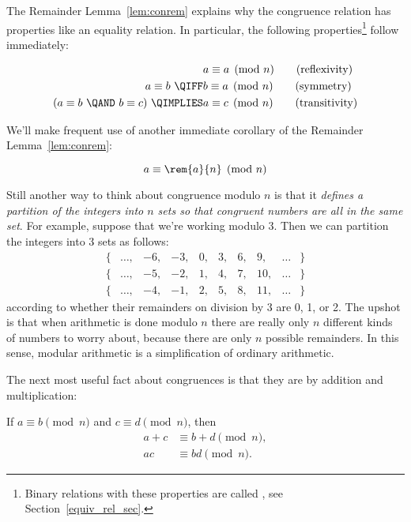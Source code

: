 The Remainder Lemma~\ref{lem:conrem} explains why the congruence
relation has properties like an equality relation.  In particular, the
following properties\footnote{Binary relations with these properties
  are called \emph{}, see
  Section~\ref{equiv_rel_sec}.}  follow immediately:
\begin{lemma}\label{mod_equiv_rel_lem} \mbox{}
\begin{align}
                  & a \equiv a \pmod{n}\tag{reflexivity}\\
a \equiv b\ \QIFF & b \equiv a \pmod{n} \tag{symmetry}\\
(a \equiv b\ \QAND\  b \equiv c)\ \QIMPLIES
                  & a \equiv c \pmod{n} \tag{transitivity}
\end{align}
\end{lemma}

We'll make frequent use of another immediate corollary of the
Remainder Lemma~\ref{lem:conrem}:
\begin{corollary}\label{aran}
\[
a \equiv \rem{a}{n} \pmod{n}
\]
\end{corollary}

Still another way to think about congruence modulo $n$ is that it
\emph{defines a partition of the integers into $n$ sets so that
  congruent numbers are all in the same set}.  For example, suppose
that we're working modulo 3.  Then we can partition the integers into
3 sets as follows:
\[
\begin{array}{cccccccccc}
\{ & \dots, & -6, & -3, & 0, & 3, & 6, & 9, & \dots & \} \\
\{ &
\dots, & -5, & -2, & 1, & 4, & 7, & 10, & \dots & \} \\
\{ & \dots, &
-4, & -1, & 2, & 5, & 8, & 11, & \dots & \}
\end{array}
\]
according to whether their remainders on division by 3 are 0, 1, or 2.
The upshot is that when arithmetic is done modulo $n$ there are really
only $n$ different kinds of numbers to worry about, because there are
only $n$ possible remainders.  In this sense, modular arithmetic is a
simplification of ordinary arithmetic.\iffalse and thus is a good
reasoning tool.\fi

The next most useful fact about congruences is that they are
 by addition and multiplication:

\begin{lemma}[Congruence]\label{mod_congruence_lem}  If
$a \equiv b \pmod{n}$ and $c \equiv d \pmod{n}$, then
\begin{align}
a + c & \equiv b + d \pmod{n},\label{mod_congruence_lem+}\\
a c   & \equiv b d   \pmod{n}.\label{mod_congruence_lem*}
\end{align}
\end{lemma}

